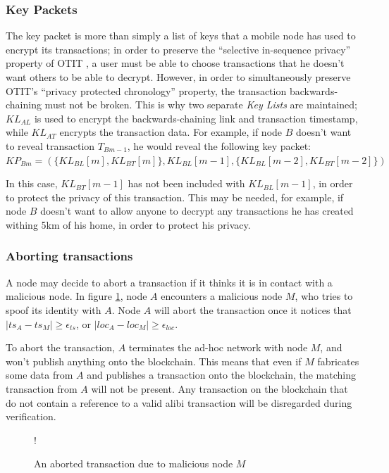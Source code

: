 \subsubsection{Key Packets} \label{sssec:key_packets}
The key packet is more than simply a list of keys that a mobile node has used to encrypt its transactions; in order to preserve the ``selective in-sequence privacy'' property of OTIT \cite{otit}, a user must be able to choose transactions that he doesn't want others to be able to decrypt. However, in order to simultaneously preserve OTIT's ``privacy protected chronology'' property, the transaction backwards-chaining must not be broken. This is why two separate \textit{Key Lists} are maintained; $KL_{AL}$ is used to encrypt the backwards-chaining link and transaction timestamp, while $KL_{AT}$ encrypts the transaction data. For example, if node $B$ doesn't want to reveal transaction $T_{Bm-1}$, he would reveal the following key packet:
\\

${KP_{Bm} = (\{KL_{BL}[m], KL_{BT}[m]\}, KL_{BL}[m-1], \{KL_{BL}[m-2], KL_{BT}[m-2]\})}$

\null
In this case, $KL_{BT}[m-1]$ has not been included with $KL_{BL}[m-1]$, in order to protect the privacy of this transaction. This may be needed, for example, if node $B$ doesn't want to allow anyone to decrypt any transactions he has created withing 5km of his home, in order to protect his privacy.

\subsubsection{Aborting transactions}
A node may decide to abort a transaction if it thinks it is in contact with a malicious node. In figure \ref{fig:aborted_transaction}, node $A$ encounters a malicious node $M$, who tries to spoof its identity with $A$. Node $A$ will abort the transaction once it notices that $|ts_A-ts_M| \geq \epsilon_{ts}$, or $|loc_A-loc_M| \geq \epsilon_{loc}$.

To abort the transaction, $A$ terminates the ad-hoc network with node $M$, and won't publish anything onto the blockchain. This means that even if $M$ fabricates some data from $A$ and publishes a transaction onto the blockchain, the matching transaction from $A$ will not be present. Any transaction on the blockchain that do not contain a reference to a valid  alibi transaction will be disregarded during verification.

\begin{figure}[h]
\resizebox {\columnwidth} {!} {}
\caption{An aborted transaction due to malicious node $M$}
\label{fig:aborted_transaction}
\end{figure}

